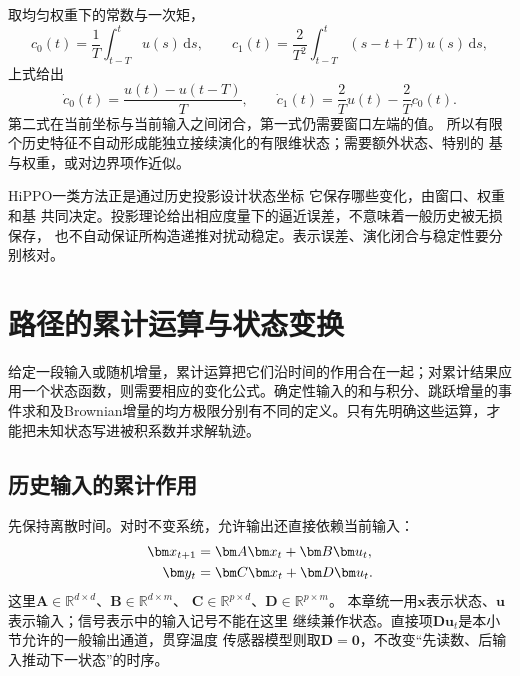取均匀权重下的常数与一次矩，
\[
  c_0(t)=\frac1T\int_{t-T}^t u(s)\,\mathrm ds,\qquad
  c_1(t)=\frac2{T^2}\int_{t-T}^t(s-t+T)u(s)\,\mathrm ds,
\]
上式给出
\[
  \dot c_0(t)=\frac{u(t)-u(t-T)}T,\qquad
  \dot c_1(t)=\frac2T u(t)-\frac2T c_0(t).
\]
第二式在当前坐标与当前输入之间闭合，第一式仍需要窗口左端的值。
所以有限个历史特征不自动形成能独立接续演化的有限维状态；需要额外状态、特别的
基与权重，或对边界项作近似。

HiPPO一类方法正是通过历史投影设计状态坐标
它保存哪些变化，由窗口、权重和基
共同决定。投影理论给出相应度量下的逼近误差，不意味着一般历史被无损保存，
也不自动保证所构造递推对扰动稳定。表示误差、演化闭合与稳定性要分别核对。

\section{路径的累计运算与状态变换}
\label{sec:action-state-path-operations}
\label{sec:action-state-random-integrals}
给定一段输入或随机增量，累计运算把它们沿时间的作用合在一起；对累计结果应用一个状态函数，则需要相应的变化公式。确定性输入的和与积分、跳跃增量的事件求和及Brownian增量的均方极限分别有不同的定义。只有先明确这些运算，才能把未知状态写进被积系数并求解轨迹。

\subsection{历史输入的累计作用}
\label{sec:signal-analysis-state-history-kernels}

先保持离散时间。对时不变系统，允许输出还直接依赖当前输入：
\begin{align}
  \bm x_{t+1}&=\bm A\bm x_t+\bm B\bm u_t,\notag\\
  \bm y_t&=\bm C\bm x_t+\bm D\bm u_t.
  \label{eq:signal-analysis-lti-state-space}
\end{align}
这里$\bm A\in\mathbb R^{d\times d}$、$\bm B\in\mathbb R^{d\times m}$、
$\bm C\in\mathbb R^{p\times d}$、$\bm D\in\mathbb R^{p\times m}$。
本章统一用$\bm x$表示状态、$\bm u$表示输入；信号表示中的输入记号不能在这里
继续兼作状态。直接项$\bm D\bm u_t$是本小节允许的一般输出通道，贯穿温度
传感器模型则取$\bm D=\bm0$，不改变“先读数、后输入推动下一状态”的时序。

